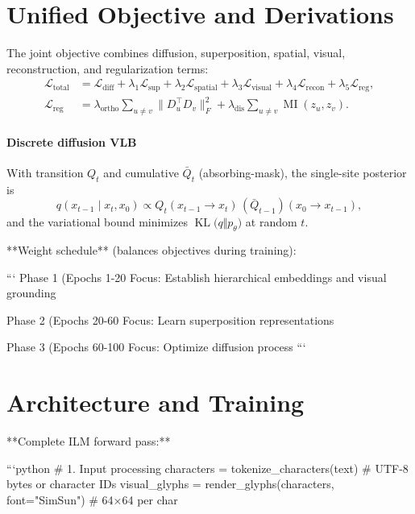 \documentclass[11pt]{article}
\begin{document}
\section{Unified Objective and Derivations}
The joint objective combines diffusion, superposition, spatial, visual, reconstruction, and regularization terms:
\begin{align}
\mathcal{L}_{\text{total}} 
&= \mathcal{L}_{\text{diff}} 
 + \lambda_1 \mathcal{L}_{\text{sup}} 
 + \lambda_2 \mathcal{L}_{\text{spatial}} 
 + \lambda_3 \mathcal{L}_{\text{visual}} 
 + \lambda_4 \mathcal{L}_{\text{recon}} 
 + \lambda_5 \mathcal{L}_{\text{reg}}, \\[-2pt]
\mathcal{L}_{\text{reg}} &= \lambda_{\text{ortho}} \sum_{u\neq v}\|D_u^\top D_v\|_F^2 + \lambda_{\text{dis}}\sum_{u\neq v} \operatorname{MI}(z_u,z_v).
\end{align}
\paragraph{Discrete diffusion VLB} With transition $Q_t$ and cumulative $\bar{Q}_t$ (absorbing-mask), the single-site posterior is
\begin{equation}
  q(x_{t-1}\mid x_t,x_0) \propto Q_t(x_{t-1}\to x_t)\,(\bar{Q}_{t-1})(x_0\to x_{t-1}),
\end{equation}
and the variational bound minimizes $\operatorname{KL}\big(q\Vert p_\theta\big)$ at random $t$.

**Weight schedule** (balances objectives during training):

```
Phase 1 (Epochs 1-20%
Focus: Establish hierarchical embeddings and visual grounding

Phase 2 (Epochs 20-60%
Focus: Learn superposition representations

Phase 3 (Epochs 60-100%
Focus: Optimize diffusion process
```

\section{Architecture and Training}

**Complete ILM forward pass:**

```python
# 1. Input processing
characters = tokenize_characters(text)  # UTF-8 bytes or character IDs
visual_glyphs = render_glyphs(characters, font="SimSun")  # 64×64 per char
\end{document}
